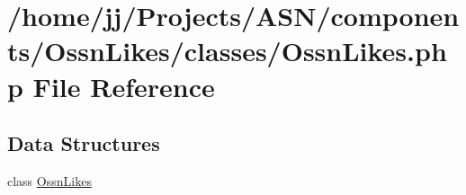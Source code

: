 \hypertarget{classes_2_ossn_likes_8php}{}\section{/home/jj/\+Projects/\+A\+S\+N/components/\+Ossn\+Likes/classes/\+Ossn\+Likes.php File Reference}
\label{classes_2_ossn_likes_8php}
\subsection*{Data Structures}
\begin{DoxyCompactItemize}
\item 
class \hyperlink{class_ossn_likes}{Ossn\+Likes}
\end{DoxyCompactItemize}
